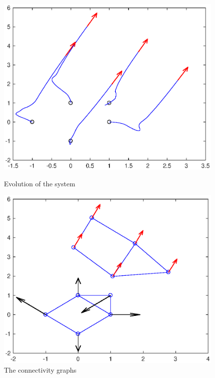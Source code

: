 \documentclass[a4paper,10pt, english]{article}
\begin{document}
\begin{figure}[ht]
  \begin{minipage}[b]{0.6\textwidth}
    \includegraphics[width=\textwidth]{figures/V5aT=20ndT=40ev.eps}
    \caption{Evolution of the system}
    \label{ev}
  \end{minipage}
  \hfill
  \begin{minipage}[b]{0.6\textwidth}
    \includegraphics[width=\textwidth]{figures/V5aT=20ndT=40g.eps}
    \caption{The connectivity graphs}
    \label{g}
  \end{minipage}
\end{figure}
  
\end{document}
